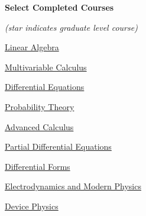 \documentclass[10pt,a4paper,ragged2e,withhyper]{altacv}
\begin{document}
\begin{paracol}{2}
\switchcolumn


\vspace{-0.5cm}

\setlength\columnsep{7pt}
\begin{multicols}{2}

    \textbf{Select Completed Courses}

    {\tiny \textit{(star indicates graduate level course)}}
    
    \vspace{0.375cm}
    \begin{tightemize}
        \item \href{https://www-math.umd.edu/undergraduate/departmental-course-pages/offered-courses/385-math-405-linear-algebra.html}{Linear Algebra}
        \item \href{https://www-math.umd.edu/undergraduate/departmental-course-pages/offered-courses/373-math-241-calculus-iii.html}{Multivariable Calculus}
        \item \href{https://www-math.umd.edu/undergraduate/departmental-course-pages/offered-courses/376-math-246-differential-equations-for-engineers.html}{Differential Equations}
        \item \href{https://www-math.umd.edu/undergraduate/departmental-course-pages/offered-courses/414-stat-410-introduction-to-probability-theory.html}{Probability Theory}
        \item \href{https://www-math.umd.edu/undergraduate/departmental-course-pages/offered-courses/387-math-410-advanced-calculus-i.html}{Advanced Calculus}
        \item \href{https://www-math.umd.edu/undergraduate/departmental-course-pages/offered-courses/404-math-462-partial-differential-equations-for-scientists-and-engineers.html}{Partial Differential Equations}
        \item \href{https://www-math.umd.edu/undergraduate/departmental-course-pages/offered-courses/398-math-437-differential-forms-and-their-applications.html}{Differential Forms}
        \item \href{https://umdphysics.umd.edu/academics/courses/966-physics-270-electrodynamics-light-relativity-modern-physics.html}{Electrodynamics and Modern Physics}
        \item \href{https://ece.umd.edu/course-schedule/course/ENEE313H}{Device Physics}
    \end{tightemize}
    

\end{multicols}
\end{paracol}
\end{document}
